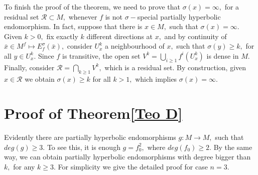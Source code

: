 \documentclass[12pt,reqno]{amsart}
\numberwithin{equation}{section}
\theoremstyle{plain}
\theoremstyle{remark}
\begin{document}
To finish the proof of the theorem, we need to prove that $\sigma(x)=\infty,$ for a residual
set $\mathcal{R}\subset M,$ whenever $f$ is not $\sigma-$special partially hyperbolic endomorphism.
In fact, suppose that there is $x\in M,$ such that $\sigma(x)=\infty.$ Given $k>0,$ fix exactly $k$
different directions at $x,$ and by continuity of $ \bar{x} \in M^f \mapsto E^{\sigma}_f(\bar{x}),$ consider $U_x^k$ a neighbourhood of $x,$ such that $\sigma(y)\geq k,$ for all $y\in U^k_x.$
Since $f$ is transitive, the open set $V^k=\displaystyle\bigcup_{i\geq 1}f^i(U^k_x)$ is dense in $M.$ Finally,
consider $\mathcal{R}=\displaystyle\bigcap_{k\geq 1}V^k, $ which is a residual set. By construction, given $x\in\mathcal{R}$
we obtain $\sigma(x)\geq k$ for all $k>1,$ which implies $\sigma(x)=\infty.$



\section{Proof of Theorem\ref{Teo D} }
 Evidently there are partially hyperbolic endomorphisms $g: M \rightarrow M,$ such that $deg(g) \geq 3.$ To see this, it is enough $g = f_0^{2},$ where $deg(f_0) \geq 2.$ By the same way, we can obtain partially hyperbolic endomorphisms with degree bigger than $k,$ for any $k \geq 3.$ For simplicity we give the detailed proof for case $n = 3.$
\end{document}
